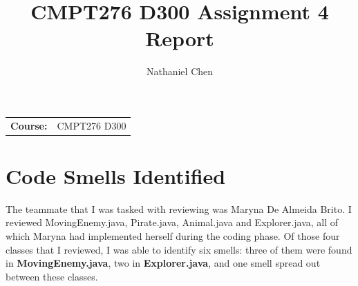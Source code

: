 \documentclass[12pt, letterpaper]{article}
\title{CMPT276 D300 Assignment 4 Report}
\author{Nathaniel Chen}
\begin{document}
\maketitle

\begin{tabular}{ll}

\textbf{Course:} & CMPT276 D300 \\

\end{tabular}


\section{Code Smells Identified}
The teammate that I was tasked with reviewing was Maryna De Almeida Brito. I reviewed MovingEnemy.java, Pirate.java, Animal.java and Explorer.java, all of which Maryna had implemented herself during the coding phase. Of those four classes that I reviewed, I was able to identify six smells: three of them were found in \textbf{MovingEnemy.java}, two in \textbf{Explorer.java}, and one smell spread out between these classes. \\
\end{document}
